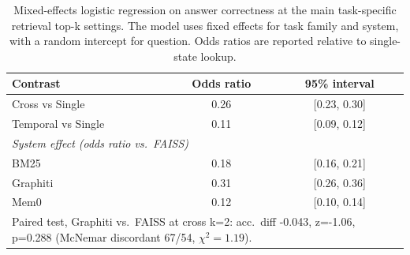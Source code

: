 \begin{table}[t]
\centering
\small
\caption{Mixed-effects logistic regression on answer correctness at the main task-specific retrieval top-k settings. The model uses fixed effects for task family and system, with a random intercept for question. Odds ratios are reported relative to single-state lookup.}
\label{tab:task-effect-mixed-logit}
\begin{tabular}{lcc}
\toprule
Contrast & Odds ratio & 95\% interval \\
\midrule
Cross vs Single & 0.26 & [0.23, 0.30] \\
Temporal vs Single & 0.11 & [0.09, 0.12] \\
\midrule
\multicolumn{3}{l}{\emph{System effect (odds ratio vs.\ FAISS)}} \\
BM25 & 0.18 & [0.16, 0.21] \\
Graphiti & 0.31 & [0.26, 0.36] \\
Mem0 & 0.12 & [0.10, 0.14] \\
\midrule
\multicolumn{3}{l}{\scriptsize Paired test, Graphiti vs.~FAISS at cross k=2: acc.~diff -0.043, z=-1.06, p=0.288 (McNemar discordant 67/54, $\chi^2{=}1.19$).} \\
\bottomrule
\end{tabular}
\end{table}
